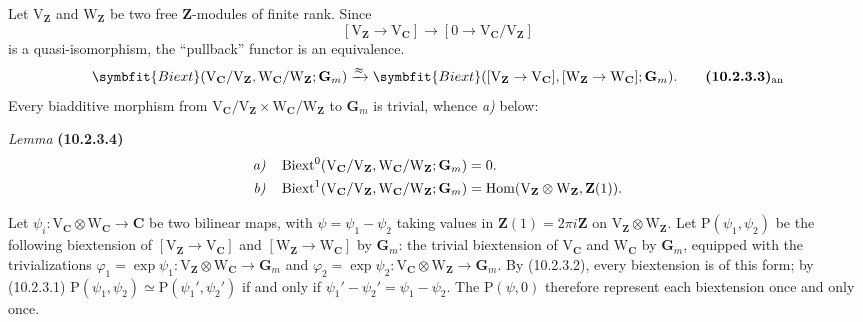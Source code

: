 \documentclass[11pt,leqno]{article}
\begin{document}
Let \(\mathrm{V}_{\mathbf{Z}}\) and \(\mathrm{W}_{\mathbf{Z}}\) be two
free \(\mathbf{Z}\)-modules of finite rank. Since
\[
[\mathrm{V}_{\mathbf{Z}}\to\mathrm{V}_{\mathbf{C}}]
\to[0\to\mathrm{V}_{\mathbf{C}}/\mathrm{V}_{\mathbf{Z}}]
\]
is a quasi-isomorphism, the “pullback” functor is an
equivalence.
\[
\symbfit{Biext}(\mathrm{V}_{\mathbf{C}}/\mathrm{V}_{\mathbf{Z}},
\mathrm{W}_{\mathbf{C}}/\mathrm{W}_{\mathbf{Z}};\mathbf{G}_m)
\xrightarrow{\approx}
\symbfit{Biext}([\mathrm{V}_{\mathbf{Z}}\to\mathrm{V}_{\mathbf{C}}],
[\mathrm{W}_{\mathbf{Z}}\to\mathrm{W}_{\mathbf{C}}];\mathbf{G}_m).
\tag*{\textbf{(10.2.3.3)}\textsubscript{an}}
\]
Every biadditive morphism from
\(\mathrm{V}_{\mathbf{C}}/\mathrm{V}_{\mathbf{Z}}\times
\mathrm{W}_{\mathbf{C}}/\mathrm{W}_{\mathbf{Z}}\)
to \(\mathbf{G}_m\) is trivial, whence \textit{a)} below:

\textit{Lemma} \textbf{(10.2.3.4)}
\[
\begin{aligned}
\text{\textit{a)}}\quad&
\operatorname{Biext}^{0}(\mathrm{V}_{\mathbf{C}}/\mathrm{V}_{\mathbf{Z}},
\mathrm{W}_{\mathbf{C}}/\mathrm{W}_{\mathbf{Z}};\mathbf{G}_m)=0.\\
\text{\textit{b)}}\quad&
\operatorname{Biext}^{1}(\mathrm{V}_{\mathbf{C}}/\mathrm{V}_{\mathbf{Z}},
\mathrm{W}_{\mathbf{C}}/\mathrm{W}_{\mathbf{Z}};\mathbf{G}_m)
=\operatorname{Hom}(\mathrm{V}_{\mathbf{Z}}\otimes
\mathrm{W}_{\mathbf{Z}},\mathbf{Z}(1)).
\end{aligned}
\]

Let \(\psi_i:\mathrm{V}_{\mathbf{C}}\otimes
\mathrm{W}_{\mathbf{C}}\to\mathbf{C}\) be two bilinear maps,
with \(\psi=\psi_1-\psi_2\) taking values in
\(\mathbf{Z}(1)=2\pi i\mathbf{Z}\) on
\(\mathrm{V}_{\mathbf{Z}}\otimes\mathrm{W}_{\mathbf{Z}}\).
Let \(\mathrm{P}(\psi_1,\psi_2)\) be the following biextension of
\([\mathrm{V}_{\mathbf{Z}}\to\mathrm{V}_{\mathbf{C}}]\) and
\([\mathrm{W}_{\mathbf{Z}}\to\mathrm{W}_{\mathbf{C}}]\) by
\(\mathbf{G}_m\): the trivial biextension of
\(\mathrm{V}_{\mathbf{C}}\) and \(\mathrm{W}_{\mathbf{C}}\) by
\(\mathbf{G}_m\), equipped with the trivializations
\(\varphi_1=\exp\psi_1:\mathrm{V}_{\mathbf{Z}}\otimes
\mathrm{W}_{\mathbf{C}}\to\mathbf{G}_m\) and
\(\varphi_2=\exp\psi_2:\mathrm{V}_{\mathbf{C}}\otimes
\mathrm{W}_{\mathbf{Z}}\to\mathbf{G}_m\).
By (10.2.3.2), every biextension is of this form; by
(10.2.3.1)
\(\mathrm{P}(\psi_1,\psi_2)\simeq\mathrm{P}(\psi_1',\psi_2')\)
if and only if \(\psi_1'-\psi_2'=\psi_1-\psi_2\).
The \(\mathrm{P}(\psi,0)\) therefore represent each biextension
once and only once.
\end{document}
